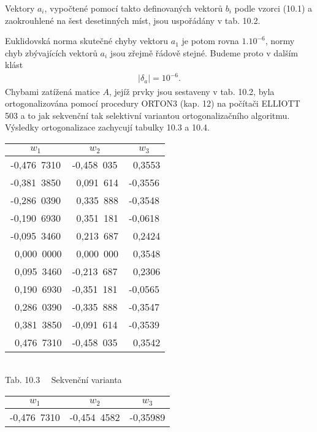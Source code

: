 {%
Vektory $a_i$, vypočtené pomocí takto definovaných vektorů $b_i$
podle vzorci (10.1) a zaokrouhlené na šest desetinných míst, jsou
uspořádány v tab. 10.2.
%

\noindent
Euklidovská   norma skutečné chyby vektoru $a_1$ je potom rovna
$1.10^{-6}$, normy chyb zbývajících vektorů $a_i$ jsou zřejmě řádově
stejné. Budeme proto v dalším klást
%
\begin{align*}
\tag{10.5}
| \delta_a | = 10^{-6}.
\end{align*}
%
Chybami zatížená matice $A$, jejíž prvky jsou sestaveny v tab.
10.2, byla ortogonalizována pomocí procedury ORTON3 (kap. 12)
na počítači ELLIOTT 503 a to jak sekvenční tak selektivní
variantou ortogonalizačního algoritmu. Výsledky ortogonalizace
zachycují tabulky 10.3 a 10.4.

\begin{table}[!htb]
\begin{subtable}{0.5\linewidth}
  \centering
  \begin{tabular}{|c|c|c|}
    \hline
    $w_1$ & $w_2$ & $w_3$ \\
    \hline
    -0,476~7310  &  -0,458~035  &  ~0,3553  \\
    -0,381~3850  &  ~0,091~614  &  -0,3556  \\
    -0,286~0390  &  ~0,335~888  &  -0,3548  \\
    -0,190~6930  &  ~0,351~181  &  -0,0618  \\
    -0,095~3460  &  ~0,213~687  &  ~0,2424  \\
    ~0,000~0000  &  ~0,000~000  &  ~0,3548  \\
    ~0,095~3460  &  -0,213~687  &  ~0,2306  \\
    ~0,190~6930  &  -0,351~181  &  -0,0565  \\
    ~0,286~0390  &  -0,335~888  &  -0,3547  \\
    ~0,381~3850  &  -0,091~614  &  -0,3539  \\
    ~0,476~7310  &  -0,458~035  &  ~0,3542  \\
     \hline
  \end{tabular}\\[1.5ex]
  Tab. 10.3 ~~Sekvenční varianta
\end{subtable}%
\begin{subtable}{0.5\linewidth}
  \centering
  \begin{tabular}{|c|c|c|}
    \hline
    $w_1$ & $w_2$ & $w_3$ \\
    \hline
    -0,476~7310  &  -0,454~4582  &  -0,35989  \\

\end{tabular}
\end{subtable}
\end{table}}

